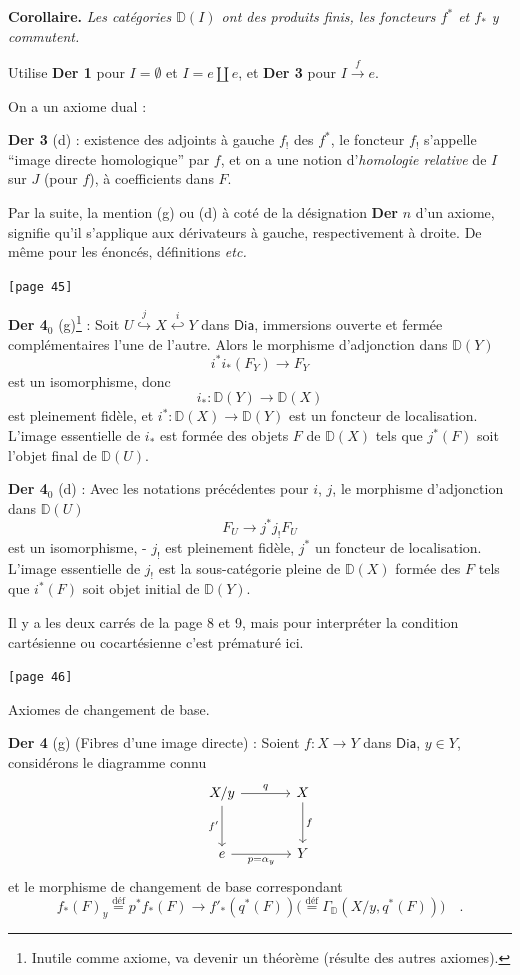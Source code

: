 \documentclass[11pt]{article}
\newcommand{\printedpage}[1]{\marginpar{\footnotesize p.~#1}}
\newcommand{\msp}[1]{\marginpar{\footnotesize [#1]}}
\newcommand{\Dia}{\mathsf{Dia}}
\newcommand{\D}{\mathbb{D}}
\begin{document}
\noindent\textbf{Corollaire.} \textit{Les catégories $\D(I)$ ont des produits finis, les foncteurs $f^{*}$ et $f_{*}$ y commutent.}

Utilise \textbf{Der 1} pour $I = \emptyset$ et $I = e \amalg e$, et \textbf{Der 3} pour $I \xrightarrow{f} e$.

On a un axiome dual :

\noindent\textbf{Der 3} (d) : existence des adjoints à gauche $f_{!}$ des $f^{*}$, le foncteur $f_{!}$ s'appelle “image directe homologique” par $f$, et on a une notion d'\textit{homologie relative} de $I$ sur $J$ (pour $f$), à coefficients dans $F$.

Par la suite, la mention (g) ou (d) à coté de la désignation \textbf{Der} $n$ d'un axiome, %
signifie qu'il s'applique aux dérivateurs à gauche, respectivement à droite. De même pour les énoncés, définitions \textit{etc.}

\noindent\msp{page 45}\texttt{[page 45]}

\noindent\textbf{Der 4}$_{0}$ (g)\footnote[13]{Inutile comme axiome, va devenir un théorème (résulte des autres axiomes).} : Soit $U \overset{j}{\hookrightarrow} X \overset{i}{\hookleftarrow} Y$ dans $\Dia$, immersions ouverte et fermée complémentaires l'une de l'autre. Alors le morphisme d'adjonction dans $\D(Y)$
\[ i^{*} i_{*}(F_{Y}) \longrightarrow F_{Y} \]
est un isomorphisme, donc
\[ i_{*} : \D(Y) \longrightarrow \D(X) \]
est pleinement fidèle, et $i^{*} : \D(X) \to \D(Y)$ est un foncteur de localisation. L'image essentielle de $i_{*}$ est formée des objets $F$ de $\D(X)$ tels que $j^{*}(F)$ soit l'objet final de $\D(U)$.


\printedpage{25}

\noindent\textbf{Der 4}$_{0}$ (d) : Avec les notations précédentes pour $i$, $j$, le morphisme d'adjonction dans $\D(U)$
\[ F_{U} \longrightarrow j^{*} j_{!} F_{U} \]
est un isomorphisme, - $j_{!}$ est pleinement fidèle, $j^{*}$ un foncteur de localisation. L'image essentielle de $j_{!}$ est la sous-catégorie pleine de $\D(X)$ formée des $F$ tels que $i^{*}(F)$ soit objet initial de $\D(Y)$.

Il y a les deux carrés de la page 8 et 9, mais pour interpréter la condition cartésienne ou cocartésienne c'est prématuré ici.

\noindent\msp{page 46}\texttt{[page 46]}

\noindent Axiomes de changement de base.

\noindent\textbf{Der 4} (g) (Fibres d'une image directe) : Soient $f : X \to Y$ dans $\Dia$, $y \in Y$, considérons le diagramme connu
\[
\begin{tikzcd}[row sep=large, column sep=large]
X/y \arrow[r, "q"] \arrow[d, "f'"'] & X \arrow[d, "f"] \\
e \arrow[r, "p = \alpha_{y}"'] & Y
\end{tikzcd}
\]
et le morphisme de changement de base correspondant
\[ f_{*}(F)_{y} \overset{\text{déf}}{=} p^{*} f_{*}(F) \longrightarrow f'_{*}(q^{*}(F))\bigl(\overset{\text{déf}}{=} \Gamma_{\D}(X/y, q^{*}(F))\bigr) \quad . \]
\end{document}
